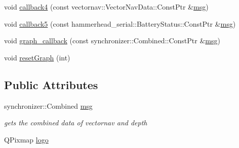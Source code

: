 \begin{DoxyCompactItemize}
void \hyperlink{classWatchdog_a3e88266855045d643b9a07ea3dc8f132}{callback4} (const vectornav\+::\+Vector\+Nav\+Data\+::\+Const\+Ptr \&\hyperlink{classWatchdog_a5ecebf3cf248b17b31e66c70daf53fc2}{msg})
\item 
void \hyperlink{classWatchdog_a48ea3b2857263a07d635272432d997d3}{callback5} (const hammerhead\+\_\+serial\+::\+Battery\+Status\+::\+Const\+Ptr \&\hyperlink{classWatchdog_a5ecebf3cf248b17b31e66c70daf53fc2}{msg})
\item 
void \hyperlink{classWatchdog_a35a6dd90da71db1a3fb51d61714d3707}{graph\+\_\+callback} (const synchronizer\+::\+Combined\+::\+Const\+Ptr \&\hyperlink{classWatchdog_a5ecebf3cf248b17b31e66c70daf53fc2}{msg})
\item 
void \hyperlink{classWatchdog_a94bff00d233b4c7c9439f8b496748cb7}{reset\+Graph} (int)
\end{DoxyCompactItemize}
\subsection*{Public Attributes}
\begin{DoxyCompactItemize}
\item 
synchronizer\+::\+Combined \hyperlink{classWatchdog_a5ecebf3cf248b17b31e66c70daf53fc2}{msg}
\begin{DoxyCompactList}\small\item\em gets the combined data of vectornav and depth \end{DoxyCompactList}\item 
Q\+Pixmap \hyperlink{classWatchdog_a0d1fa20c84e3244a915b0e0170626ffe}{logo}
\end{DoxyCompactItemize}
